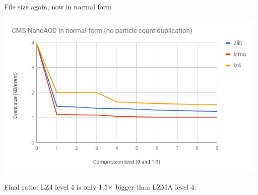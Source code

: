 \documentclass{beamer}
\begin{document}
\begin{frame}{File size again, now in normal form}
\begin{center}
\includegraphics[width=\linewidth]{final-size.png}
\end{center}

Final ratio: LZ4 level 4 is only 1.5$\times$ bigger than LZMA level 4.
\vspace{\baselineskip}
\end{frame}
\end{document}
